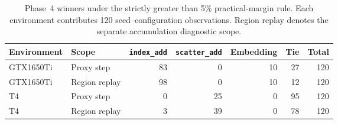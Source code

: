 \begin{table}[t]
\centering\fontsize{9}{11}\selectfont
\caption{Phase~4 winners under the strictly greater than 5\% practical-margin rule. Each environment contributes 120 seed--configuration observations. Region replay denotes the separate accumulation diagnostic scope.}
\label{tab:phase4-winner-counts}
\setlength{\tabcolsep}{3pt}
\renewcommand{\arraystretch}{1.12}
\begin{tabular*}{\textwidth}{@{\extracolsep{\fill}}llrrrrr@{}}
\toprule
Environment & Scope & \texttt{index\_add} & \texttt{scatter\_add} & Embedding & Tie & Total \\
\midrule
GTX1650Ti & Proxy step & 83 & 0 & 10 & 27 & 120 \\
GTX1650Ti & Region replay & 98 & 0 & 10 & 12 & 120 \\
T4 & Proxy step & 0 & 25 & 0 & 95 & 120 \\
T4 & Region replay & 3 & 39 & 0 & 78 & 120 \\
\bottomrule
\end{tabular*}
\end{table}